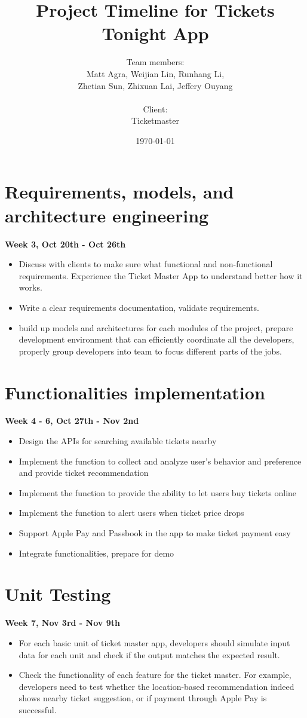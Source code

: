 \documentclass{article}
\title{Project Timeline for Tickets Tonight App}  %
\author{Team members: \\ Matt Agra, Weijian Lin, Runhang Li, \\Zhetian Sun, Zhixuan Lai, Jeffery Ouyang \\ \\ Client: \\Ticketmaster}%
\date{\today} %
\begin{document}
	
	\maketitle %
	

	\section{\large Requirements, models, and architecture engineering}
	 \hfill \small\textbf{Week 3, Oct 20th - Oct 26th}
		\begin{itemize}
			\item Discuss with clients to make sure what functional and non-functional requirements. Experience the Ticket Master App to understand better how it works. 
			\item Write a clear requirements documentation, validate requirements.
			\item build up models and architectures for each modules of the project, prepare development environment that can efficiently coordinate all the developers, properly group developers into team to focus different parts of the jobs.
		\end{itemize}
	
	\section{\large Functionalities implementation}
	\hfill \small\textbf{Week 4 - 6, Oct 27th - Nov 2nd}
		\begin{itemize}
			\item Design the APIs for searching available tickets nearby
			\item Implement the function to collect and analyze user's behavior and preference and provide ticket recommendation
			\item Implement the function to provide the ability to let users buy tickets online
			\item Implement the function to alert users when ticket price drops
			\item Support Apple Pay and Passbook in the app to make ticket payment easy
			\item Integrate functionalities, prepare for demo
		\end{itemize}
	
	\section{\large Unit Testing}
	\hfill \small\textbf{Week 7, Nov 3rd - Nov 9th}
		\begin{itemize}
			\item For each basic unit of ticket master app, developers should simulate input data for each unit and check if the output matches the expected result.
			\item Check the functionality of each feature for the ticket master. For example, developers need to test whether the location-based recommendation indeed shows nearby ticket suggestion, or if payment through Apple Pay is successful.
		\end{itemize}
	
\end{document}
